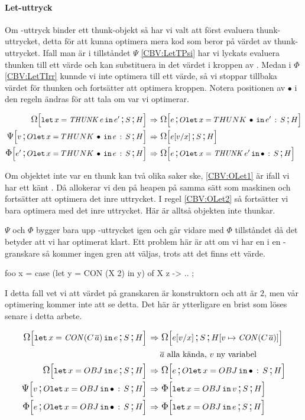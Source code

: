 \documentclass[../Optimise]{subfiles}
\begin{document}
\paragraph{Let-uttryck}

Om -uttryck binder ett thunk-objekt så har vi valt att först evaluera thunk-uttrycket, 
detta för att kunna optimera mera kod som beror på värdet av thunk-uttrycket. Ifall
man är i tillståndet $\Psi$ \eqref{CBV:LetTPsi} har vi lyckats evaluera thunken till ett värde och kan
substituera in det värdet i kroppen av . Medan i $\Phi$ \eqref{CBV:LetTIrr} kunnde vi inte
optimera till ett värde, så vi stoppar tillbaka värdet för thunken och fortsätter att
optimera kroppen. Notera positionen av $\bullet$ i den regeln ändras för att tala om
var vi optimerar.

\begin{align}
\label{CBV:LetTOmg} \OMEGA SH{\eLet x{\THUNK e}{e'}}  \rulesep &\, \OMEGA{\oLet x{e'}S}He\\
\label{CBV:LetTPsi} \PSI{\oLet xeS}Hv  \rulesep &\, \OMEGA SH{e[v/x]} \\
\label{CBV:LetTIrr} \IRR{\oLet xeS}H{e'}  \rulesep &\, \OMEGA{\oLetObj x{\THUNK{e'}}S}He
\end{align}

Om objektet inte var en thunk kan två olika saker ske, \eqref{CBV:OLet1} är ifall 
vi har ett känt . Då allokerar vi den på heapen på samma sätt som maskinen
och fortsätter att optimera det inre uttrycket. I regel \eqref{CBV:OLet2} så 
fortsätter vi bara optimera med det inre uttrycket. Här är alltså objekten
inte thunkar.

$\Psi$ och $\Phi$ bygger bara upp -uttrycket igen och går vidare med $\Phi$ tillståndet
då det betyder att vi har optimerat klart. Ett problem här är att om vi har en 
i en -granskare så kommer ingen gren att väljas, trots att det finns ett värde.

\begin{codeEx}
foo x = case (let y = CON (X 2) in y) of
    { X z -> ..
    };
\end{codeEx} 

I detta fall vet vi att värdet på granskaren är konstruktorn  och att  är $2$, men vår optimering
kommer inte att se detta. Det här är ytterligare en brist som löses senare i detta arbete.

\begin{align}
\label{CBV:OLet1} \OMEGA SH{\eLet x{\CON{C}{\many{a}}}{e}}  \rulesep &\, \OMEGA S{\heap{v}{\CON{C}{\many{a}}}}{e[v/x]}\\
 & \many{a} \text{ alla kända, } v \text{ ny variabel} \nonumber \\
\label{CBV:OLet2}\OMEGA SH{\eLet x{OBJ}{e}}  \rulesep &\, \OMEGA{\oLetObj x{OBJ}S}He\\
\PSI{\oLetObj x{OBJ}S}Hv  \rulesep &\, \IRR SH{\eLet x{OBJ}v}\\
\IRR{\oLetObj x{OBJ}S}He  \rulesep &\, \IRR SH{\eLet x{OBJ}e}
\end{align}
\end{document}
